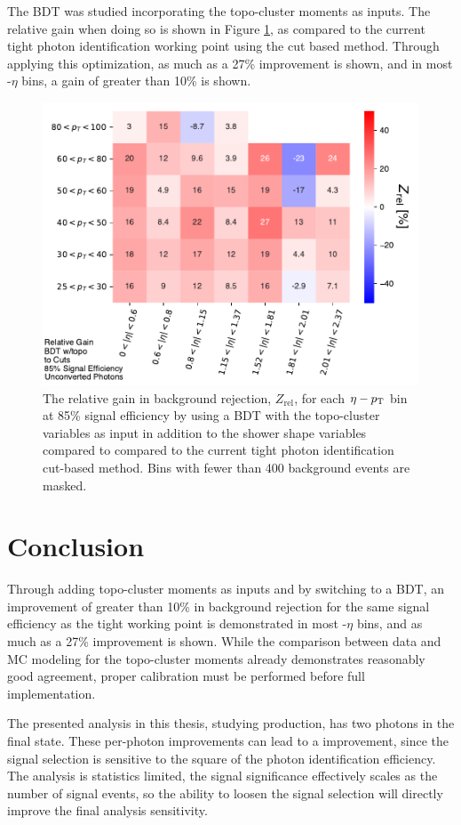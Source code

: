 The \gls{BDT} was studied incorporating the topo-cluster moments as inputs. The relative gain when doing so is shown in Figure \ref{fig:bdt-topo-vs-cuts}, as compared to the current tight photon identification working point using the cut based method. Through applying this optimization, as much as a 27\% improvement is shown, and in most \pt-$\eta$ bins, a gain of greater than 10\% is shown.
\begin{figure}[!htb]
    \centering
    \includegraphics[width=.85\textwidth]{chapters/chapter4_photonID/images/BDTtopo_v_cuts_normed.pdf}
    \caption[The relative gain in background rejection by using a \gls{BDT} with topo-cluster variables compared to the current tight photon identification methods]
    {The relative gain in background rejection, $Z_{\text{rel}}$, for each $\eta-p_{\text{T}}$ bin at 85\% signal efficiency by using a \gls{BDT} with the topo-cluster variables as input in addition to the shower shape variables compared to compared to the current tight photon identification cut-based method. Bins with fewer than 400 background events are masked.}
    \label{fig:bdt-topo-vs-cuts}
\end{figure}

\section{Conclusion}

Through adding topo-cluster moments as inputs and by switching to a \gls{BDT}, an improvement of greater than 10\% in background rejection for the same signal efficiency as the tight working point is demonstrated in most \pt-$\eta$ bins, and as much as a 27\% improvement is shown. While the comparison between data and \gls{MC} modeling for the topo-cluster moments already demonstrates reasonably good agreement, proper calibration must be performed before full implementation. 

The presented analysis in this thesis, studying \hhyybb production, has two photons in the final state. These per-photon improvements can lead to a improvement, since the signal selection is sensitive to the square of the photon identification efficiency. The analysis is statistics limited, the signal significance effectively scales as the number of signal events, so the ability to loosen the signal selection will directly improve the final analysis sensitivity.